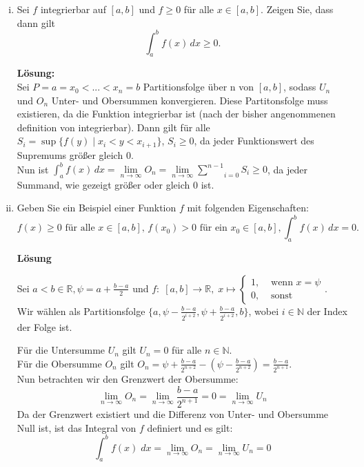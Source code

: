 \documentclass[11pt,a4paper,ngerman]{article}
\begin{document}
\begin{enumerate}[i)]
    \item Sei $f$ integrierbar auf $[a,b]$ und $f\geq 0$ für alle $x \in [a,b]$. Zeigen Sie, dass dann gilt
$$
    \int_{a}^{b} f(x) \, dx \geq 0.
$$

\textbf{Lösung:}\\

Sei $P=a=x_0<...<x_n=b$ Partitionsfolge über n von $[a,b]$, sodass $U_n$ und $O_n$ Unter- und Obersummen konvergieren. Diese Partitonsfolge muss existieren, da die Funktion integrierbar ist (nach der bisher angenommenen definition von integrierbar). Dann gilt für alle $S_i = \sup \{ f(y) \; | \; x_i < y < x_{i+1} \}$, $S_i \geq 0$, da jeder Funktionswert des Supremums größer gleich $0$.\\
 Nun ist $\int_a^b f(x) \, dx = \underset{n \rightarrow \infty}{\lim} O_n = \underset{n \rightarrow \infty}{\lim} \underset{i=0}{\overset{n-1}{\sum}} S_i \geq 0$, da jeder Summand, wie gezeigt größer oder gleich 0 ist.

    \item Geben Sie ein Beispiel einer Funktion $f$ mit folgenden Eigenschaften:
$$
    f(x) \geq 0 \text{ für alle } x\in [a,b], \, f(x_0) > 0\text { für ein } x_0 \in [a,b], \int_{a}^{b} f(x) \, dx = 0.
$$

\textbf{Lösung}

Sei $a < b \in \mathbb{R}, \psi = a + \frac{b-a}{2}$ und $f:\; [a,b] \to \mathbb{R},\; x \mapsto \begin{cases}  
                                                    1, &\text{ wenn } x = \psi\\
                                                    0, &\text{ sonst}
                                                 \end{cases}$.\\

Wir wählen als Partitionsfolge $\{a,\psi - \frac{b-a}{2^{i+2}},\psi + \frac{b-a}{2^{i+2}},b\}$, wobei $i \in \mathbb{N}$ der Index der Folge ist.

Für die Untersumme $U_n$ gilt $U_n = 0$ für alle $n \in \mathbb{N}$. \\
Für die Obersumme $O_n$ gilt $O_n = \psi + \frac{b-a}{2^{n+2}} - \left(\psi - \frac{b-a}{2^{n+2}}\right)
 = \frac{b-a}{2^{n+1}}$. \\

Nun betrachten wir den Grenzwert der Obersumme:
$$
\lim_{n \to \infty}{O_n} = \lim_{n \to \infty}{\frac{b-a}{2^{n+1}}} = 0 = \lim_{n \to \infty}{U_n}
$$
Da der Grenzwert existiert und die Differenz von Unter- und Obersumme Null ist, ist das Integral von $f$ definiert und es gilt:
$$ \int_{a}^{b}{f(x) \; dx} = \lim_{n \to \infty}{O_n} = \lim_{n \to \infty}{U_n} = 0 $$



\end{enumerate}
\end{document}
